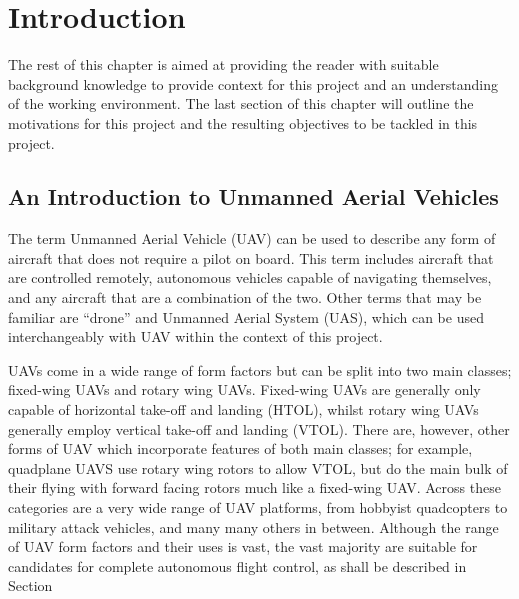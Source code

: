 
\chapter{Introduction}  %
\label{intro}


\graphicspath{{Chapter1/Figs/}}



The rest of this chapter is aimed at providing the reader with suitable background knowledge to provide context for this project and an understanding of the working environment. The last section of this chapter will outline the motivations for this project and the resulting objectives to be tackled in this project. 

\section{An Introduction to Unmanned Aerial Vehicles} 
\label{intro:UAVs}

The term Unmanned Aerial Vehicle (UAV) can be used to describe any form of aircraft that does not require a pilot on board. This term includes aircraft that are controlled remotely, autonomous vehicles capable of navigating themselves, and any aircraft that are a combination of the two. Other terms that may be familiar are ``drone'' and Unmanned Aerial System (UAS), which can be used interchangeably with UAV within the context of this project. 

UAVs come in a wide range of form factors but can be split into two main classes; fixed-wing UAVs and rotary wing UAVs. Fixed-wing UAVs are generally only capable of horizontal take-off and landing (HTOL), whilst rotary wing UAVs generally employ vertical take-off and landing (VTOL). There are, however, other forms of UAV which incorporate features of both main classes; for example, quadplane UAVS use rotary wing rotors to allow VTOL, but do the main bulk of their flying with forward facing rotors much like a fixed-wing UAV. Across these categories are a very wide range of UAV platforms, from hobbyist quadcopters to military attack vehicles, and many many others in between. %
Although the range of UAV form factors and their uses is vast, the vast majority are suitable for candidates for complete autonomous flight control, as shall be described in Section %
 
